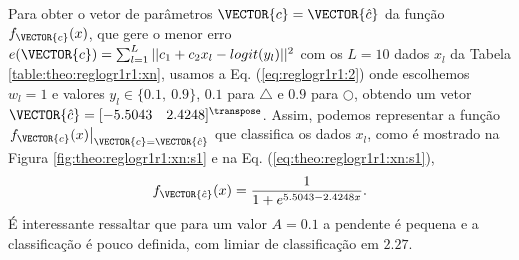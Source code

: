 \begin{SolutionT}\label{sol:theo:reglogr1r1:s1}
Para obter o vetor de parâmetros $\VECTOR{c}=\VECTOR{\hat{c}}$ da função $f_{\VECTOR{c}}(x)$, 
que gere o menor erro $e(\VECTOR{c}) =  \sum_{l=1}^{L} ||c_1 +c_2 x_l-logit(y_l)||^2$
com os $L=10$ dados $x_l$ da Tabela \ref{table:theo:reglogr1r1:xn},
usamos a Eq. (\ref{eq:reglogr1r1:2}) onde escolhemos $w_l=1$ e valores $y_l \in \{0.1,~ 0.9\}$,
$0.1$ para $\bigtriangleup$ e $0.9$ para $\bigcirc$,
obtendo um vetor $\VECTOR{\hat{c}}=[-5.5043\quad 2.4248 ]^{\transpose}$.
Assim, podemos representar a função $\left.f_{\VECTOR{c}}(x)\right|_{\VECTOR{c}=\VECTOR{\hat{c}}}$ que classifica os dados $x_l$, 
como é mostrado na Figura \ref{fig:theo:reglogr1r1:xn:s1} e na Eq. (\ref{eq:theo:reglogr1r1:xn:s1}),
\begin{equation}\label{eq:theo:reglogr1r1:xn:s1}
f_{\VECTOR{\hat{c}}}(x)= \frac{1}{1+e^{ 5.5043-2.4248 x}}.
\end{equation}
É interessante ressaltar que para um valor $A=0.1$ a pendente é pequena e a classificação é pouco definida,
com limiar de classificação em $2.27$.
\end{SolutionT}

